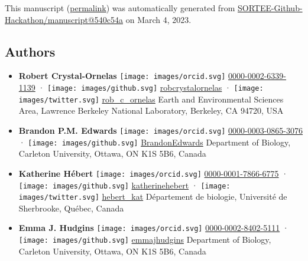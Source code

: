 This manuscript
(\href{https://SORTEE-Github-Hackathon.github.io/manuscript/v/540c54a0e1a9c1b107387aa297db8144b6a79d5e/}{permalink})
was automatically generated
from \href{https://github.com/SORTEE-Github-Hackathon/manuscript/tree/540c54a0e1a9c1b107387aa297db8144b6a79d5e}{SORTEE-Github-Hackathon/manuscript@540c54a}
on March 4, 2023.

\hypertarget{authors}{%
\subsection{Authors}\label{authors}}

\begin{itemize}
\item
  \textbf{Robert Crystal-Ornelas}
  \texttt{[image: images/orcid.svg]}
  \href{https://orcid.org/0000-0002-6339-1139}{0000-0002-6339-1139}
  · \texttt{[image: images/github.svg]}
  \href{https://github.com/robcrystalornelas}{robcrystalornelas}
  · \texttt{[image: images/twitter.svg]}
  \href{https://twitter.com/rob_c_ornelas}{rob\_c\_ornelas}
  Earth and Environmental Sciences Area, Lawrence Berkeley National Laboratory, Berkeley, CA 94720, USA
\item
  \textbf{Brandon P.M. Edwards}
  \texttt{[image: images/orcid.svg]}
  \href{https://orcid.org/0000-0003-0865-3076}{0000-0003-0865-3076}
  · \texttt{[image: images/github.svg]}
  \href{https://github.com/BrandonEdwards}{BrandonEdwards}
  Department of Biology, Carleton University, Ottawa, ON K1S 5B6, Canada
\item
  \textbf{Katherine Hébert}
  \texttt{[image: images/orcid.svg]}
  \href{https://orcid.org/0000-0001-7866-6775}{0000-0001-7866-6775}
  · \texttt{[image: images/github.svg]}
  \href{https://github.com/katherinehebert}{katherinehebert}
  · \texttt{[image: images/twitter.svg]}
  \href{https://twitter.com/hebert_kat}{hebert\_kat}
  Département de biologie, Université de Sherbrooke, Québec, Canada
\item
  \textbf{Emma J. Hudgins}
  \texttt{[image: images/orcid.svg]}
  \href{https://orcid.org/0000-0002-8402-5111}{0000-0002-8402-5111}
  · \texttt{[image: images/github.svg]}
  \href{https://github.com/emmajhudgins}{emmajhudgins}
  Department of Biology, Carleton University, Ottawa, ON K1S 5B6, Canada

\end{itemize}
